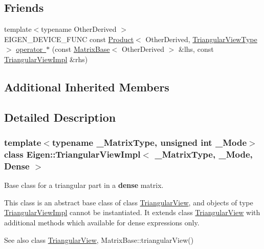 \subsection*{Friends}
\begin{DoxyCompactItemize}
\item 
{\footnotesize template$<$typename Other\+Derived $>$ }\\E\+I\+G\+E\+N\+\_\+\+D\+E\+V\+I\+C\+E\+\_\+\+F\+U\+NC const \mbox{\hyperlink{class_eigen_1_1_product}{Product}}$<$ Other\+Derived, \mbox{\hyperlink{class_eigen_1_1_triangular_view}{Triangular\+View\+Type}} $>$ \mbox{\hyperlink{class_eigen_1_1_triangular_view_impl_3_01___matrix_type_00_01___mode_00_01_dense_01_4_a2d454ef19893aa36d5dbb7f7c455e4b7}{operator $\ast$}} (const \mbox{\hyperlink{class_eigen_1_1_matrix_base}{Matrix\+Base}}$<$ Other\+Derived $>$ \&lhs, const \mbox{\hyperlink{class_eigen_1_1_triangular_view_impl}{Triangular\+View\+Impl}} \&rhs)
\end{DoxyCompactItemize}
\subsection*{Additional Inherited Members}


\subsection{Detailed Description}
\subsubsection*{template$<$typename \+\_\+\+Matrix\+Type, unsigned int \+\_\+\+Mode$>$\newline
class Eigen\+::\+Triangular\+View\+Impl$<$ \+\_\+\+Matrix\+Type, \+\_\+\+Mode, Dense $>$}

Base class for a triangular part in a {\bfseries{dense}} matrix. 

This class is an abstract base class of class \mbox{\hyperlink{class_eigen_1_1_triangular_view}{Triangular\+View}}, and objects of type \mbox{\hyperlink{class_eigen_1_1_triangular_view_impl}{Triangular\+View\+Impl}} cannot be instantiated. It extends class \mbox{\hyperlink{class_eigen_1_1_triangular_view}{Triangular\+View}} with additional methods which available for dense expressions only.

\begin{DoxySeeAlso}{See also}
class \mbox{\hyperlink{class_eigen_1_1_triangular_view}{Triangular\+View}}, Matrix\+Base\+::triangular\+View() 
\end{DoxySeeAlso}


